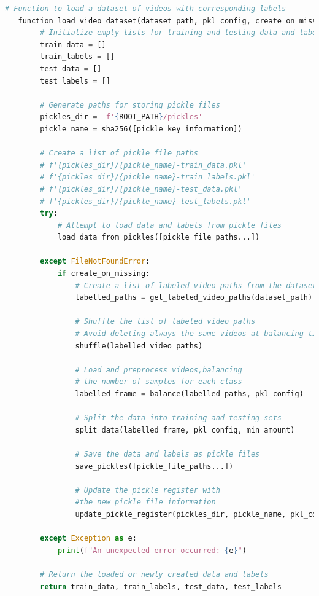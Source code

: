 \begin{lstlisting}[language=python, caption={Pickles generation}, label={lst:PicklesGeneration}]
    # Function to load a dataset of videos with corresponding labels
   function load_video_dataset(dataset_path, pkl_config, create_on_missing):
        # Initialize empty lists for training and testing data and labels
        train_data = []
        train_labels = []
        test_data = []
        test_labels = []
    
        # Generate paths for storing pickle files
        pickles_dir =  f'{ROOT_PATH}/pickles'
        pickle_name = sha256([pickle key information])
    
        # Create a list of pickle file paths
        # f'{pickles_dir}/{pickle_name}-train_data.pkl'
        # f'{pickles_dir}/{pickle_name}-train_labels.pkl'
        # f'{pickles_dir}/{pickle_name}-test_data.pkl'
        # f'{pickles_dir}/{pickle_name}-test_labels.pkl'
        try:
            # Attempt to load data and labels from pickle files
            load_data_from_pickles([pickle_file_paths...])
    
        except FileNotFoundError:
            if create_on_missing:
                # Create a list of labeled video paths from the dataset
                labelled_paths = get_labeled_video_paths(dataset_path)
    
                # Shuffle the list of labeled video paths
                # Avoid deleting always the same videos at balancing time
                shuffle(labelled_video_paths)
    
                # Load and preprocess videos,balancing
                # the number of samples for each class
                labelled_frame = balance(labelled_paths, pkl_config)
    
                # Split the data into training and testing sets
                split_data(labelled_frame, pkl_config, min_amount)
    
                # Save the data and labels as pickle files
                save_pickles([pickle_file_paths...])
    
                # Update the pickle register with 
                #the new pickle file information
                update_pickle_register(pickles_dir, pickle_name, pkl_config)
    
        except Exception as e:
            print(f"An unexpected error occurred: {e}")
    
        # Return the loaded or newly created data and labels
        return train_data, train_labels, test_data, test_labels
    

\end{lstlisting}
